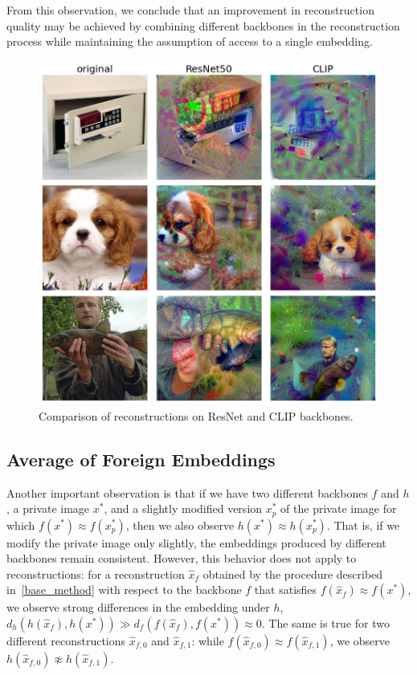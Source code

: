 \documentclass[10pt,twocolumn]{article}
\begin{document}
From this observation, we conclude that an improvement in reconstruction quality may be achieved by combining different backbones in the reconstruction process while maintaining the assumption of access to a single embedding.
\begin{figure}[ht]
    \centering
    \includegraphics[width=\linewidth]{figures/resnet-vs-clip.png}
    \caption{
        Comparison of reconstructions on ResNet and CLIP backbones.
    }
    \label{fig:resnet_vs_clip}
\end{figure}

\subsection{Average of Foreign Embeddings}
Another important observation is that if we have two different backbones $f$ and $h$, a private image $x^*$, and a slightly modified version $x^*_p$ of the private image for which $f(x^*)\approx f(x^*_p)$, then we also observe $h(x^*)\approx h(x^*_p)$.
That is, if we modify the private image only slightly, the embeddings produced by different backbones remain consistent.
However, this behavior does not apply to reconstructions: for a reconstruction $\hat x_f$ obtained by the procedure described in~\ref{base_method} with respect to the backbone $f$ that satisfies $f(\hat x_f)\approx f(x^*)$, we observe strong differences in the embedding under $h$, $d_h(h(\hat x_f),h(x^*)) \gg d_f(f(\hat x_f),f(x^*))\approx 0$.
The same is true for two different reconstructions $\hat x_{f,0}$ and $\hat x_{f,1}$: while $f(\hat x_{f,0})\approx f(\hat x_{f,1})$, we observe $h(\hat x_{f,0})\not\approx h(\hat x_{f,1})$.
\end{document}
